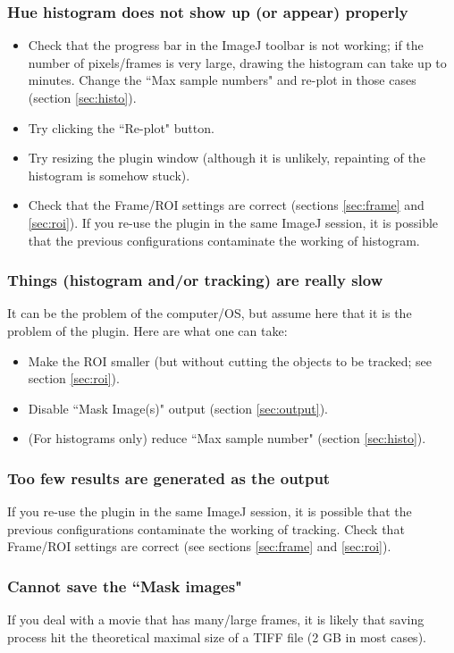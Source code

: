 \documentclass[a4paper,oneside,10pt]{article}
\newcommand{\secref}[1]{(section \ref{sec:#1})}
\begin{document}
\subsubsection{Hue histogram does not show up (or appear) properly}
\begin{itemize}
\item Check that the progress bar in the ImageJ toolbar is not working; if the number of pixels/frames is very large, drawing the histogram can take up to minutes. Change the ``Max sample numbers" and re-plot in those cases \secref{histo}.
\item Try clicking the ``Re-plot" button.
\item Try resizing the plugin window (although it is unlikely, repainting of the histogram is somehow stuck).
\item Check that the Frame/ROI settings are correct (sections \ref{sec:frame} and \ref{sec:roi}). If you re-use the plugin in the same ImageJ session, it is possible that the previous configurations contaminate the working of histogram.
\end{itemize}

\subsubsection{Things (histogram and/or tracking) are really slow}
It can be the problem of the computer/OS, but assume here that it is the problem of the plugin. Here are what one can take:
\begin{itemize}
\item Make the ROI smaller (but without cutting the objects to be tracked; see section \ref{sec:roi}).
\item Disable ``Mask Image(s)" output \secref{output}.
\item (For histograms only) reduce ``Max sample number" \secref{histo}.
\end{itemize}

\subsubsection{Too few results are generated as the output}
If you re-use the plugin in the same ImageJ session, it is possible that the previous configurations contaminate the working of tracking. Check that Frame/ROI settings are correct (see sections \ref{sec:frame} and \ref{sec:roi}).

\subsubsection{Cannot save the ``Mask images"}
If you deal with a movie that has many/large frames, it is likely that saving process hit the theoretical maximal size of a TIFF file (2 GB in most cases).
\end{document}
